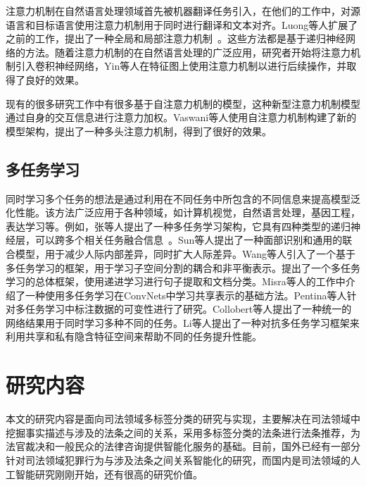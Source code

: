 注意力机制在自然语言处理领域首先被机器翻译任务引入\cite{bahdanau2014neural}，在他们的工作中，对源语言和目标语言使用注意力机制用于同时进行翻译和文本对齐。Luong等人扩展了之前的工作，提出了一种全局和局部注意力机制~\cite{LuongPM15}。这些方法都是基于递归神经网络的方法。随着注意力机制的在自然语言处理的广泛应用，研究者开始将注意力机制引入卷积神经网络，Yin等人在特征图上使用注意力机制以进行后续操作，并取得了良好的效果\cite{YinSXZ16}。

现有的很多研究工作中有很多基于自注意力机制的模型\cite{LinFSYXZB17, Jacob181004805}，这种新型注意力机制模型通过自身的交互信息进行注意力加权。Vaswani等人使用自注意力机制构建了新的模型架构，提出了一种多头注意力机制\cite{VaswaniSPUJGKP17}，得到了很好的效果。

\subsection{多任务学习}
同时学习多个任务的想法是通过利用在不同任务中所包含的不同信息来提高模型泛化性能。该方法广泛应用于各种领域，如计算机视觉\cite{Torralba2007Sharing, Yim2015Rotating, Zhang2013Robust}，自然语言处理\cite{Liu2017Adversarial, Glorot2011Domain, collobert2008unified, Liu2015Representation, luong2015multi}，基因工程\cite{Dong2014Inferring, Zhong2013User}，表达学习\cite{argyriou2007multi, Kang2011Learning, Zhang2010Probabilistic}等。例如，张等人提出了一种多任务学习架构，它具有四种类型的递归神经层，可以跨多个相关任务融合信息~\cite{Zhang2017A}。Sun等人提出了一种面部识别和通用的联合模型，用于减少人际内部差异，同时扩大人际差异\cite{Sun2014Deep}。Wang等人引入了一个基于多任务学习的框架，用于学习子空间分割的耦合和非平衡表示\cite{Wang2015Multi}。提出了一个多任务学习的总体框架，使用递进学习进行句子提取和文档分类\cite{Masaru2017Masaru}。Misra等人的工作中介绍了一种使用多任务学习在ConvNets中学习共享表示的基础方法\cite{Misra2016Cross}。Pentina等人针对多任务学习中标注数据的可变性进行了研究\cite{Pentina2017Multi}。Collobert等人提出了一种统一的网络结果用于同时学习多种不同的任务\cite{collobert2008unified}。Li等人提出了一种对抗多任务学习框架来利用共享和私有隐含特征空间来帮助不同的任务提升性能\cite{Li2016Self}。

\section{研究内容}
本文的研究内容是面向司法领域多标签分类的研究与实现，主要解决在司法领域中挖掘事实描述与涉及的法条之间的关系，采用多标签分类的法条进行法条推荐，为法官裁决和一般民众的法律咨询提供智能化服务的基础。目前，国外已经有一部分针对司法领域犯罪行为与涉及法条之间关系智能化的研究，而国内是司法领域的人工智能研究刚刚开始，还有很高的研究价值。

